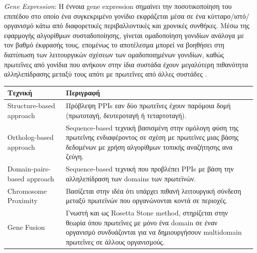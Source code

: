 \textit{Gene Expression}: Η έννοια gene expression σημαίνει την ποσοτικοποίηση του επιπέδου στο οποίο ένα συγκεκριμένο γονίδιο εκφράζεται μέσα σε ένα κύτταρο/ιστό/οργανισμό κάτω από διαφορετικές περιβαλλοντικές και χρονικές συνθήκες. Μέσω της εφαρμογής αλγορίθμων συσταδοποίησης, γίνεται ομαδοποίηση γονιδίων ανάλογα με τον βαθμό έκφρασής τους, επομένως το αποτέλεσμα μπορεί να βοηθήσει στη διατύπωση των λειτουργικών σχέσεων των ομαδοποιημένων γονιδίων, καθώς πρωτεΐνες από γονίδια που ανήκουν στην ίδια συστάδα έχουν μεγαλύτερη πιθανότητα αλληλεπίδρασης μεταξύ τους απότι με πρωτεΐνες από άλλες συστάδες \cite{Grigoriev2001}.

\medskip
\begingroup
\centering
\begin{tabularx}{0.9\textwidth} { 
  | >{\raggedright\arraybackslash}X 
  | >{\centering\arraybackslash}X 
  | >{\raggedleft\arraybackslash}X | }
 \hline
 \textbf{Τεχνική} & \textbf{Περιγραφή}\\
 \hline
 Structure-based approach & Πρόβλεψη PPIs εαν δύο πρωτεΐνες έχουν παρόμοια δομή (πρωτοταγή, δευτεροταγή ή τεταρτοταγή). \\ 
 \hline
 Ortholog-based approach & Sequence-based τεχνική βασισμένη στην ομόλογη φύση της πρωτεΐνης ενδιαφέροντος σε σχέση με πρωτεϊνες μιας βάσης δεδομένων με χρήση αλγορίθμων τοπικής αναζήτησης ανα ζεύγη. \\
 \hline
 Domain-pairs-based approach & Sequence-based τεχνική που προβλέπει PPIs με βάση την αλληλεπίδραση των domains των πρωτεϊνών. \\
 \hline
 Chromosome Proximity & Βασίζεται στην ιδέα ότι υπάρχει πιθανή λειτουργική σύνδεση μεταξύ πρωτεϊνών που οργανώνονται κοντά σε περιοχές. \\
 \hline
 Gene Fusion & Γνωστή και ως Rosetta Stone method, στηρίζεται στην θεωρία όπου πρωτεΐνες με μόνο ένα domain σε έναν οργανισμό συνδυάζονται για να δημιουργήσουν multidomain πρωτεΐνες σε άλλους οργανισμούς. \\
 \hline
 \end{tabularx}
 \label{In Silico τεχνικές εντοπισμού PPIs}
\endgroup

